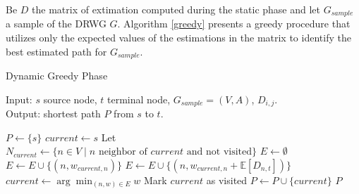 Be $D$ the matrix of extimation computed during the static phase and let $G_{sample}$ a sample of the DRWG $G$. Algorithm \ref{greedy} presents a greedy procedure that utilizes only the expected values of the estimations in the matrix to identify the best estimated path for $G_{sample}$.

\begin{algorithm}
	\caption{Dynamic Greedy Phase} 
	\label{greedy}
    Input: $s$ source node, $t$ terminal node, $G_{sample} = (V,A)$, $D_{i,j}$.  \\
    Output: shortest path $P$ from $s$ to $t$.
	\begin{algorithmic}[1]
        \State $P \gets \{s\}$
        \State $current \gets s$
            \State Let $N_{current} \gets \{n \in V \mid n \text{ neighbor of } current \text{ and not visited}\}$
            \State $E \gets \emptyset$
                    \State $E \gets E \cup \{(n, w_{current,n})\}$
                \Else
                    \State $E \gets E \cup \{(n, w_{current,n} + \mathbb{E}[D_{n,t}])\}$
                \EndIf
            \EndFor
            \State $current \gets \arg\min_{(n,w) \in E} w$
            \State Mark $current$ as visited
            \State $P \gets P \cup \{current\}$
        \EndWhile
        \State \Return $P$
	\end{algorithmic} 
\end{algorithm}
